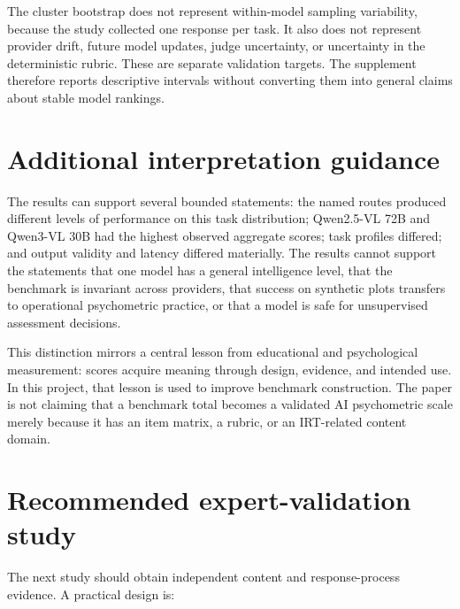 \documentclass[11pt]{article}
\begin{document}
The cluster bootstrap does not represent within-model sampling variability, because the study collected one response per task. It also does not represent provider drift, future model updates, judge uncertainty, or uncertainty in the deterministic rubric. These are separate validation targets. The supplement therefore reports descriptive intervals without converting them into general claims about stable model rankings.

\section{Additional interpretation guidance}

The results can support several bounded statements: the named routes produced different levels of performance on this task distribution; Qwen2.5-VL 72B and Qwen3-VL 30B had the highest observed aggregate scores; task profiles differed; and output validity and latency differed materially. The results cannot support the statements that one model has a general intelligence level, that the benchmark is invariant across providers, that success on synthetic plots transfers to operational psychometric practice, or that a model is safe for unsupervised assessment decisions.

This distinction mirrors a central lesson from educational and psychological measurement: scores acquire meaning through design, evidence, and intended use. In this project, that lesson is used to improve benchmark construction. The paper is not claiming that a benchmark total becomes a validated AI psychometric scale merely because it has an item matrix, a rubric, or an IRT-related content domain.

\section{Recommended expert-validation study}

The next study should obtain independent content and response-process evidence. A practical design is:
\end{document}
